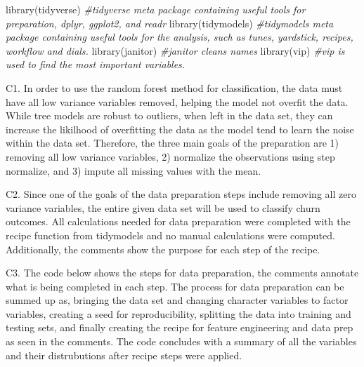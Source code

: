 \documentclass[
]{article}
\newenvironment{Shaded}{\begin{snugshade}}{\end{snugshade}}
\newcommand{\CommentTok}[1]{\textcolor[rgb]{0.56,0.35,0.01}{\textit{#1}}}
\newcommand{\FunctionTok}[1]{\textcolor[rgb]{0.00,0.00,0.00}{#1}}
\newcommand{\NormalTok}[1]{#1}
\begin{document}
\begin{Shaded}
\begin{Highlighting}[]
\FunctionTok{library}\NormalTok{(tidyverse) }\CommentTok{\#tidyverse meta package containing useful tools for preparation, dplyr, ggplot2, and readr}
\FunctionTok{library}\NormalTok{(tidymodels) }\CommentTok{\#tidymodels meta package containing useful tools for the analysis, such as tunes, yardstick, recipes, workflow and dials. }
\FunctionTok{library}\NormalTok{(janitor) }\CommentTok{\#janitor cleans names }
\FunctionTok{library}\NormalTok{(vip) }\CommentTok{\#vip is used to find the most important variables. }
\end{Highlighting}
\end{Shaded}

C1. In order to use the random forest method for classification, the
data must have all low variance variables removed, helping the model not
overfit the data. While tree models are robust to outliers, when left in
the data set, they can increase the likilhood of overfitting the data as
the model tend to learn the noise within the data set. Therefore, the
three main goals of the preparation are 1) removing all low variance
variables, 2) normalize the observations using step normalize, and 3)
impute all missing values with the mean.

C2. Since one of the goals of the data preparation steps include
removing all zero variance variables, the entire given data set will be
used to classify churn outcomes. All calculations needed for data
preparation were completed with the recipe function from tidymodels and
no manual calculations were computed. Additionally, the comments show
the purpose for each step of the recipe.

C3. The code below shows the steps for data preparation, the comments
annotate what is being completed in each step. The process for data
preparation can be summed up as, bringing the data set and changing
character variables to factor variables, creating a seed for
reproducibility, splitting the data into training and testing sets, and
finally creating the recipe for feature engineering and data prep as
seen in the comments. The code concludes with a summary of all the
variables and their distrubutions after recipe steps were applied.
\end{document}
